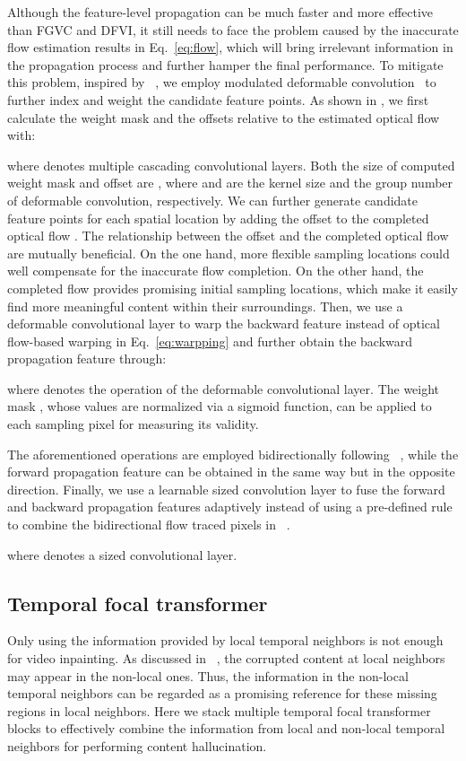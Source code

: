 \documentclass[final]{cvpr}
\begin{document}
Although the feature-level propagation can be much faster and more effective than FGVC and DFVI, it still needs to face the problem caused by the inaccurate flow estimation results in Eq.~\eqref{eq:flow}, which will bring irrelevant information in the propagation process and further hamper the final performance.
To mitigate this problem, inspired by ~\cite{wang2019edvr,chan2020understanding,chan2021basicvsr,chan2021basicvsr++}, we employ modulated deformable convolution~\cite{zhu2019deformable} to further index and weight the candidate feature points.
As shown in , we first calculate the weight mask  and the offsets  relative to the estimated optical flow with:

where  denotes multiple cascading convolutional layers.
Both the size of computed weight mask  and offset  are , where  and  are the kernel size and the group number of deformable convolution, respectively.
We can further generate  candidate feature points for each spatial location by adding the offset  to the completed optical flow .
The relationship between the offset  and the completed optical flow  are mutually beneficial.
On the one hand, more flexible sampling locations could well compensate for the inaccurate flow completion.
On the other hand, the completed flow provides promising initial sampling locations, which make it easily find more meaningful content within their surroundings.
Then, we use a deformable convolutional layer to warp the backward feature  instead of optical flow-based warping in Eq.~\eqref{eq:warpping} and further obtain the backward propagation feature  through:

where  denotes the operation of the deformable convolutional layer.
The weight mask , whose values are normalized via a sigmoid function, can be applied to each sampling pixel for measuring its validity.

The aforementioned operations are employed bidirectionally following ~\cite{Xu_2019_CVPR,Gao-ECCV-FGVC}, while the forward propagation feature  can be obtained in the same way but in the opposite direction.
Finally, we use a learnable  sized convolution layer to fuse the forward and backward propagation features adaptively instead of using a pre-defined rule to combine the bidirectional flow traced pixels in ~\cite{Xu_2019_CVPR}.

where  denotes a  sized convolutional layer.

\subsection{Temporal focal transformer}
\label{sec:focal_transformer}
Only using the information provided by local temporal neighbors is not enough for video inpainting.
As discussed in ~\cite{Gao-ECCV-FGVC}, the corrupted content at local neighbors may appear in the non-local ones.
Thus, the information in the non-local temporal neighbors can be regarded as a promising reference for these missing regions in local neighbors. 
Here we stack multiple temporal focal transformer blocks to effectively combine the information from local and non-local temporal neighbors for performing content hallucination.
\end{document}
